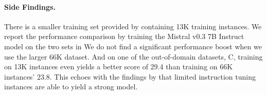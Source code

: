 \documentclass[11pt]{article}
\begin{document}


\paragraph{Side Findings.}
There is a smaller training set provided by \citet{li2023table} containing 13K training instances.
We report the performance comparison by training the Mistral v0.3 7B Instruct model on the two sets in 
We do not find a significant performance boost when we use the larger 66K dataset.
And on one of the out-of-domain datasets, C, training on 13K instances even yields a better score of 29.4 than training on 66K instances' 23.8.
This echoes with the findings by \citet{zhou2024lima,deng2025rethinking} that limited instruction tuning instances are able to yield a strong model.
\end{document}
